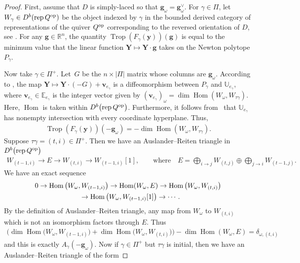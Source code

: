 \documentclass[pdftex]{sigma}%
\def\R{{\mathbb R}}
\def\Hom{\operatorname{Hom}}
\def\E{{\mathbb E}}
\def\U{{\mathbb U}}
\def\y{{\mathbf y}}
\def\v{{\mathbf v}}
\def\Trop{\operatorname{Trop}}
\def\g{{\mathbf g}}
\def\Y{{\mathbf Y}}
\numberwithin{equation}{section}
\begin{document}
\begin{proof}
First, assume that $D$ is simply-laced so that $\g_\omega = \g^\vee_\omega$. For $\gamma \in \Pi$, let $W_\gamma \in D^b( {\rm rep}\,Q^{\rm op})$ be the object indexed by $\gamma$ in the bounded derived category of representations of the quiver $Q^{\rm op}$ corresponding to the reversed orientation of $D$, see \cite[Section~3]{BDMTY}. For any $\g \in \R^n$, the quantity $\Trop(F_\gamma(\y))(\g)$ is equal to the minimum value that the linear function $\Y \mapsto \Y \cdot \g$ takes on the Newton polytope $P_\gamma$.

Now take $\gamma \in \Pi^+$. Let~$G$ be the $n \times |\Pi|$ matrix whose columns are $\g_\omega$. According to \cite[Proof of Theorem~1]{BDMTY}, the map $\Y \mapsto \Y \cdot (-G) + \v_{e_{\gamma}}$ is a diffeomorphism between $P_\gamma$ and $\U_{e_\gamma}$, where $\v_{e_{\gamma}} \in \E_{e_\gamma}$ is the integer vector given by $(\v_{e_\gamma})_{\omega} = \dim \Hom(W_\omega, W_{\tau \gamma})$. Here, $\Hom$ is taken within $D^b\big( {\rm rep}\,Q^{\rm op}\big)$. Furthermore, it follows from~\cite{BDMTY} that $\U_{e_\gamma}$ has nonempty intersection with every coordinate hyperplane. Thus,
\begin{gather*}
\Trop(F_\gamma(\y))(-\g_\omega) = -\dim \Hom(W_\omega, W_{\tau \gamma}).
\end{gather*}
Suppose $\tau \gamma = (t,i) \in \Pi^+$. Then we have an Auslander--Reiten triangle in $D^b\big( {\rm rep}\, Q^{\rm op}\big)$
\begin{gather*}
W_{(t-1,i)} \to E \to W_{(t,i)} \to W_{(t-1,i)} [1],
 \qquad \text{where} \quad
E = \bigoplus_{i \to j} W_{(t,j)} \oplus \bigoplus_{j \to i} W_{(t-1,j)}.
\end{gather*}
We have an exact sequence
\begin{gather*}
0 \to \Hom\big(W_\omega, W_{(t-1,i)}\big) \to \Hom(W_\omega, E) \to \Hom\big(W_\omega, W_{(t,i)}\big)
\\ \hphantom{0}
{}\to \Hom\big(W_\omega, W_{(t-1,i)} [1]\big) \to \cdots.
\end{gather*}
By the definition of Auslander--Reiten triangle, any map from $W_\omega$ to $W_{(t,i)}$ which is not an isomorphism factors through $E$. Thus
\begin{gather*}
\big(\dim \Hom\big(W_\omega, W_{(t-1,i)}\big) + \dim\Hom\big(W_\omega, W_{(t,i)}\big)\big) - \dim \Hom(W_\omega, E) =\delta_{\omega,(t,i)}
\end{gather*}
and this is exactly $A_\gamma(-\g_\omega)$. Now if $\gamma \in \Pi^+$ but $\tau \gamma$ is initial, then we have an Auslander--Reiten triangle of the form

\end{proof}
\end{document}
